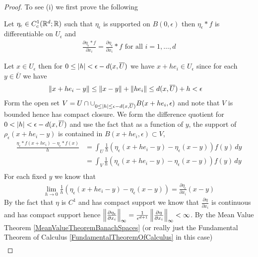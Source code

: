\begin{proof}
To see (i) we first prove the following

\begin{clm} Let $\eta_\epsilon \in C^1_c(\mathbb{R}^d; \mathbb{R})$ such that $\eta_\epsilon$ is supported on $B(0,\epsilon)$ then $\eta_\epsilon \ast f$ is differentiable on $U_\epsilon$ and 
\begin{align*}
\frac{\partial \eta_\epsilon \ast f}{\partial x_i} = \frac{\partial \eta_\epsilon}{\partial x_i} \ast f \text{ for all $i=1, \dotsc, d$}
\end{align*}
\end{clm}
Let $x \in U_\epsilon$ then for $0 \leq \left \vert h \right \vert < \epsilon - d(x,\overline{U})$ we have $x + h e_i \in U_\epsilon$ since for each $y \in \overline{U}$ we have
\begin{align*}
\left \lVert x+he_i - y \right \rVert &\leq \left \lVert x- y \right \rVert + \left \lVert he_i \right \rVert \leq d(x,\overline{U}) + h < \epsilon 
\end{align*}
Form the open set $V = U \cap \cup_{0 \leq \left \vert h \right \vert \leq \epsilon - d(x,\overline{U}) } B(x+he_i, \epsilon)$ and note that $V$ is bounded hence has compact closure.
We form the difference quotient for $0 < \left \vert h \right \vert < \epsilon - d(x,\overline{U})$ and use the fact that as a function of $y$, the support of $\rho_\epsilon(x+he_i-y)$ 
is contained in $B(x+he_i,\epsilon) \subset V$,
\begin{align*}
\frac{\eta_\epsilon \ast f(x+he_i) - \eta_\epsilon \ast f(x)}{h} &= \int_U \frac{1}{h} \left (\eta_\epsilon(x+he_i-y)- \eta_\epsilon(x-y) \right ) f(y) \, dy \\
&= \int_{V } \frac{1}{h} \left (\eta_\epsilon(x+he_i-y)- \eta_\epsilon(x-y) \right ) f(y) \, dy \\
\end{align*}
For each fixed $y$ we know that 
\begin{align*}
\lim_{h \to 0} \frac{1}{h} \left (\eta_\epsilon(x+he_i-y)- \eta_\epsilon(x-y) \right ) = \frac{\partial \eta_\epsilon}{\partial x_i}(x-y)
\end{align*}
By the fact that $\eta$ is $C^1$ and has compact support we know that $\frac{\partial \eta}{\partial x_i}$ is continuous and has compact support hence $\left \lVert \frac{\partial \eta_\epsilon}{\partial x_i} \right \rVert_\infty = \frac{1}{\epsilon^{d+1}}\left \lVert \frac{\partial \eta}{\partial x_i} \right \rVert_\infty < \infty$.  By the Mean Value Theorem \ref{MeanValueTheoremBanachSpaces} (or really just the Fundamental Theorem of Calculus \ref{FundamentalTheoremOfCalculus} in this case)
\begin{align*}

\end{align*}
\end{proof}

